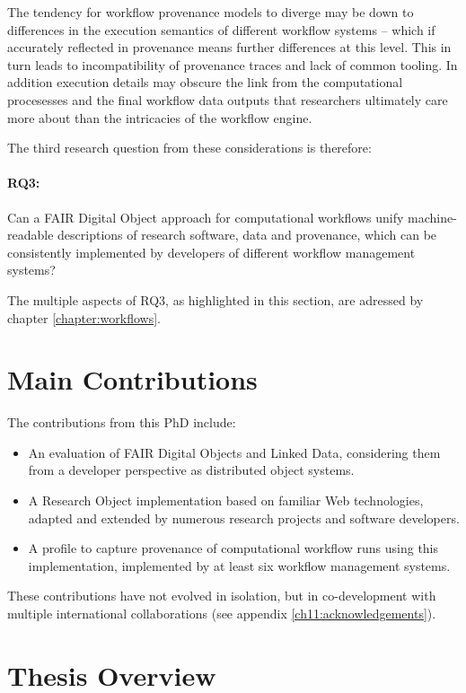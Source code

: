 The tendency for workflow provenance models to diverge may be down to differences in the execution semantics of different workflow systems -- which if accurately reflected in provenance means further differences at this level. This in turn leads to incompatibility of provenance traces and lack of common tooling. In addition execution details may obscure the link from the computational procesesses and the final workflow data outputs that researchers ultimately care more about than the intricacies of the workflow engine.

The third research question from these considerations is therefore: 

\paragraph{RQ3:} \label{rq3} Can a FAIR Digital Object approach for computational workflows unify machine-readable descriptions of research software, data and provenance, which can be consistently implemented by developers of different workflow management systems?

The multiple aspects of RQ3, as highlighted in this section, are adressed by chapter \ref{chapter:workflows}.


\section{Main Contributions}
\label{intro:contributions}

The contributions from this PhD include:

\begin{itemize}
    \item An evaluation of FAIR Digital Objects and Linked Data, considering them from a developer perspective as distributed object systems.
    \item A Research Object implementation based on familiar Web technologies, adapted and extended by numerous research projects and software developers.
    \item A profile to capture provenance of computational workflow runs using this implementation, implemented by at least six workflow management systems.
\end{itemize}

These contributions have not evolved in isolation, but in co-development with multiple international collaborations (see appendix \vref{ch11:acknowledgements}).


\section{Thesis Overview}
\label{intro:overview}

